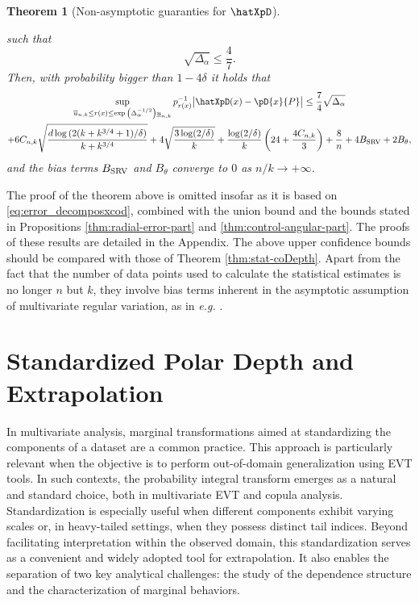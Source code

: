 \documentclass{article}
\numberwithin{equation}{section}
\newtheorem{theorem}{Theorem}[section]
\newcommand{\coD}[2]{\pD{#1}{#2}}
\begin{document}
\begin{theorem}[Non-asymptotic guaranties for \(\hatXpD\)]
\begin{enumerate}[label=(\roman*)]
        such that
        \begin{equation*}
            \sqrt{\Delta_{\alpha}}\leq \frac{4}{7}.
        \end{equation*}
        Then, with probability bigger than \(1-4\delta\) it holds
        that 
        \begin{multline}\label{eq:xcod_finite_sample_bound_ration_version}
        \sup_{\overline{u}_{n,k}\leq r(x)\leq
            \exp{\left(\Delta_\alpha^{-1/2}\right)}\underline{u}_{n,k}}
            p_{r(x)}^{-1}\big|
        \hatXpD(x) -\coD{x}{P}\big|\leq 
            \frac{7}{4}\sqrt{\Delta_{\alpha}} \\
           + 6C_{n,k}\sqrt{\frac{d\log{(2(k+k^{3/4}+1)/\delta)}}{k+k^{3/4}}}
            + 4\sqrt{\frac{3\log(2/\delta)}{k}}
            +\frac{\log(2/\delta)}{k}\left(24+\frac{4C_{n,k}}{3}\right)
            + \frac{8}{n} +
            4B_\textnormal{SRV} +
        2B_{\theta},
        \end{multline}
        and the bias terms \(B_\textnormal{SRV}\) and \(B_{\theta}\)
        converge to \(0\) as \(n/k\to+\infty\).
\end{enumerate}
\end{theorem}

The proof of the theorem above is omitted insofar  as it is based on \eqref{eq:error_decomposxcod}, combined with the union bound and the bounds stated in Propositions
\ref{thm:radial-error-part}
and \ref{thm:control-angular-part}. The proofs of these results are detailed in the Appendix. 
The above upper confidence bounds should be compared with those of Theorem \ref{thm:stat-coDepth}. Apart from the fact that the number of data points used to calculate the statistical estimates is no longer $n$ but $k$, they involve bias terms inherent in the asymptotic assumption of multivariate regular variation, as in \textit{e.g.} \cite{ClemenconJalalzaiSabourinSegers2023}.


\section{Standardized Polar Depth and Extrapolation}\label{sec:standardize}
%


In multivariate analysis, marginal transformations aimed at standardizing the components of a dataset are a common practice. This approach is particularly relevant when the objective is to perform out-of-domain generalization using EVT tools. In such contexts, the probability integral transform  emerges as a natural and standard choice, both in multivariate EVT  and copula analysis.
Standardization  is especially useful when different components exhibit varying scales or, in heavy-tailed settings, when they possess distinct tail indices. Beyond facilitating interpretation within the observed domain, this standardization serves as a convenient and widely adopted tool for extrapolation. It also enables the separation of two key analytical challenges: the study of the dependence structure and the characterization of marginal behaviors.
\end{document}
